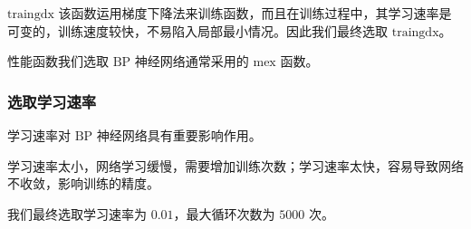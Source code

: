     $\mathrm{traingdx}$ 该函数运用梯度下降法来训练函数，而且在训练过程中，其学习速率是可变的，训练速度较快，不易陷入局部最小情况。因此我们最终选取 $\mathrm{traingdx}$。

    性能函数我们选取 $\mathrm{BP}$ 神经网络通常采用的 $\mathrm{mex}$ 函数。

  \subsubsection{选取学习速率}

    学习速率对 $\mathrm{BP}$ 神经网络具有重要影响作用。

    学习速率太小，网络学习缓慢，需要增加训练次数；学习速率太快，容易导致网络不收敛，影响训练的精度。

    我们最终选取学习速率为 $0.01$，最大循环次数为 $5000$ 次。